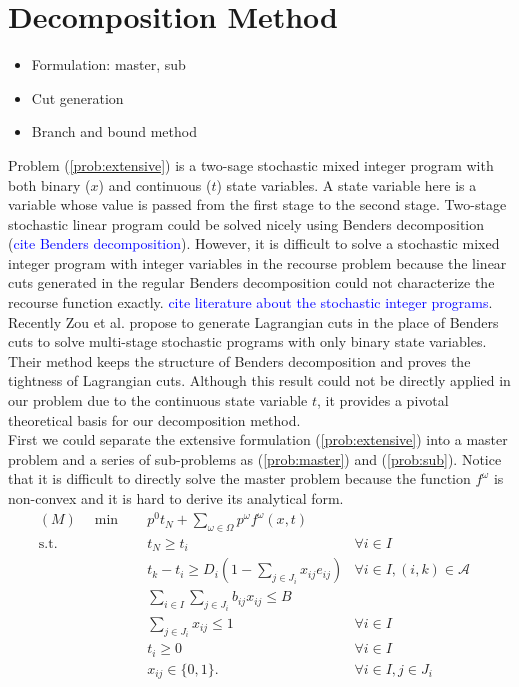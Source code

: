 \documentclass[11pt]{article}
\begin{document}
\section{Decomposition Method} \label{sec:decomposition}
	\begin{itemize}
		\item Formulation: master, sub
		\item Cut generation
		\item Branch and bound method
	\end{itemize}
	Problem (\ref{prob:extensive}) is a two-sage stochastic mixed integer program with both binary (\(x\)) and continuous (\(t\)) state variables. A state variable here is a variable whose value is passed from the first stage to the second stage. Two-stage stochastic linear program could be solved nicely using Benders decomposition (\textcolor{blue}{cite Benders decomposition}). However, it is difficult to solve a stochastic mixed integer program with integer variables in the recourse problem because the linear cuts generated in the regular Benders decomposition could not characterize the recourse function exactly. \textcolor{blue}{cite literature about the stochastic integer programs}. \\
	\newline 
	Recently Zou et al. \cite{zou2016nested} propose to generate Lagrangian cuts in the place of Benders cuts to solve multi-stage stochastic programs with only binary state variables. Their method keeps the structure of Benders decomposition and proves the tightness of Lagrangian cuts. Although this result could not be directly applied in our problem due to the continuous state variable \(t\), it provides a pivotal theoretical basis for our decomposition method.\\
	\newline
	First we could separate the extensive formulation (\ref{prob:extensive}) into a master problem and a series of sub-problems as (\ref{prob:master}) and (\ref{prob:sub}). Notice that it is difficult to directly solve the master problem because the function \(f^\omega\) is non-convex and it is hard to derive its analytical form.
	\begin{subequations}
		\label{prob:master}
		\begin{align}
		(M) \quad \min \quad & p^0 t_N + \sum_{\omega \in \Omega} p^\omega f^\omega(x,t) & \\
		\text{s.t.} \quad & t_N \geq t_i & \forall i \in I\\
		& t_k - t_i \geq D_{i}(1 - \sum_{j \in J_i} x_{ij} e_{ij}) & \forall i \in I, (i,k) \in \mathcal{A}\\
		& \sum_{i \in I} \sum_{j \in J_i} b_{ij}x_{ij} \leq B & \\
		& \sum_{j \in J_i} x_{ij} \leq 1 & \forall i \in I\\
		& t_i \geq 0 & \forall i \in I\\
		& x_{ij} \in \{0,1\}. & \forall i \in I, j \in J_i&
		\end{align}
	\end{subequations}
\end{document}
